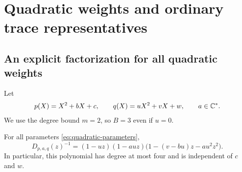 \section{Quadratic weights and ordinary trace representatives}\label{sec:consequences}

\subsection{An explicit factorization for all quadratic weights}

Let
\begin{equation}\label{eq:quadratic-parameters}
 p(X)=X^2+bX+c,\qquad q(X)=uX^2+vX+w,
 \qquad a\in\mathbb C^*.
\end{equation}
We use the degree bound $m=2$, so $B=3$ even if $u=0$.

\begin{proposition}\label{prop:quadratic}
For all parameters \eqref{eq:quadratic-parameters},
\begin{equation}\label{eq:quadratic-determinant}
 D_{p,a,q}(z)^{-1}
   =(1-uz)(1-auz)\bigl(1-(v-bu)z-au^2z^2\bigr).
\end{equation}
In particular, this polynomial has degree at most four and is
independent of $c$ and $w$.
\end{proposition}

